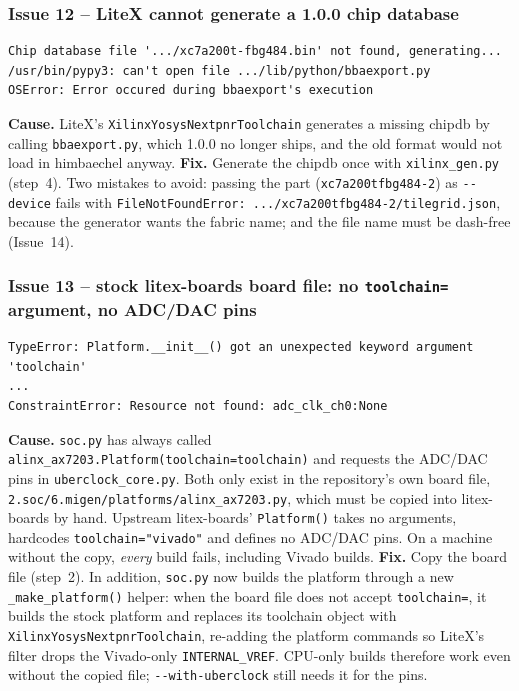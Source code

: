 \documentclass[11pt]{article}
\begin{document}
\subsubsection*{Issue 12 -- LiteX cannot generate a 1.0.0 chip database}
\begin{lstlisting}[style=termout]
Chip database file '.../xc7a200t-fbg484.bin' not found, generating...
/usr/bin/pypy3: can't open file .../lib/python/bbaexport.py
OSError: Error occured during bbaexport's execution
\end{lstlisting}
\textbf{Cause.} LiteX's \lstinline{XilinxYosysNextpnrToolchain} generates a
missing chipdb by calling \lstinline{bbaexport.py}, which 1.0.0 no longer
ships, and the old format would not load in himbaechel anyway.
\textbf{Fix.} Generate the chipdb once with \lstinline{xilinx_gen.py}
(step~4). Two mistakes to avoid: passing the part
(\lstinline{xc7a200tfbg484-2}) as \lstinline{--device} fails with
\lstinline{FileNotFoundError: .../xc7a200tfbg484-2/tilegrid.json}, because
the generator wants the fabric name; and the file name must be dash-free
(Issue~14).

\subsubsection*{Issue 13 -- stock litex-boards board file: no
\texttt{toolchain=} argument, no ADC/DAC pins}
\begin{lstlisting}[style=termout]
TypeError: Platform.__init__() got an unexpected keyword argument 'toolchain'
...
ConstraintError: Resource not found: adc_clk_ch0:None
\end{lstlisting}
\textbf{Cause.} \lstinline{soc.py} has always called
\lstinline{alinx_ax7203.Platform(toolchain=toolchain)} and requests the
ADC/DAC pins in \lstinline{uberclock_core.py}. Both only exist in the
repository's own board file, \lstinline{2.soc/6.migen/platforms/alinx_ax7203.py},
which must be copied into litex-boards by hand. Upstream
litex-boards' \lstinline{Platform()} takes no arguments, hardcodes
\lstinline{toolchain="vivado"} and defines no ADC/DAC pins. On a machine
without the copy, \emph{every} build fails, including Vivado builds.
\textbf{Fix.} Copy the board file (step~2). In addition,
\lstinline{soc.py} now builds the platform through a new
\lstinline{_make_platform()} helper: when the board file does not accept
\lstinline{toolchain=}, it builds the stock platform and replaces its
toolchain object with \lstinline{XilinxYosysNextpnrToolchain}, re-adding
the platform commands so LiteX's filter drops the Vivado-only
\lstinline{INTERNAL_VREF}. CPU-only builds therefore work even without the
copied file; \lstinline{--with-uberclock} still needs it for the pins.
\end{document}
